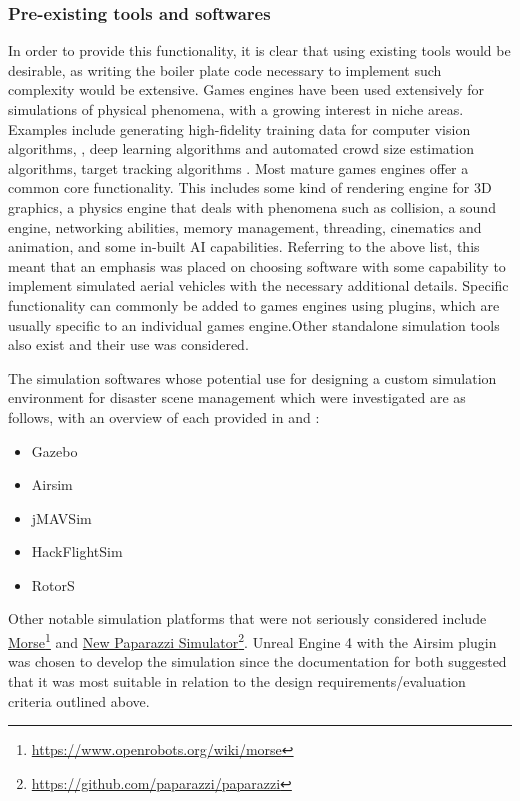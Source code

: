 \subsubsection{Pre-existing tools and softwares}
In order to provide this functionality, it is clear that using existing tools would be desirable, as writing the boiler plate code necessary to implement such complexity would be extensive. Games engines have been used extensively for simulations of physical phenomena, with a growing interest in niche areas. Examples include generating high-fidelity training data for computer vision algorithms, \cite{QiuUnrealCV:Engine}, deep learning algorithms\cite{GaidonVirtualAnalysis} and automated crowd size estimation algorithms\cite{Lee2018DigitalCrowds}, target tracking algorithms \cite{Mueller2016ATracking}. Most mature games engines offer a common core functionality. This includes some kind of rendering engine for 3D graphics, a physics engine that deals with phenomena such as collision, a sound engine, networking abilities, memory management, threading, cinematics and animation, and some in-built AI capabilities. Referring to the above list, this meant that an emphasis was placed on choosing software with some capability to implement simulated aerial vehicles with the necessary additional details. Specific functionality can commonly be added to games engines using plugins, which are usually specific to an individual games engine.Other standalone simulation tools also exist and their use was considered.\par

The simulation softwares whose potential use for designing a custom simulation environment for disaster scene management which were investigated are as follows, with an overview of each provided in \cite{Ebeid2018ASimulators} and \cite{ShahAirSim:Vehicles}: 
\begin{itemize}
    \item Gazebo
    \item Airsim
    \item jMAVSim
    \item HackFlightSim
    \item RotorS
\end{itemize}
Other notable simulation platforms that were not seriously considered include \href{https://www.openrobots.org/wiki/morse}{Morse}\footnote{\href {https://www.openrobots.org/wiki/morse}{https://www.openrobots.org/wiki/morse}} and \href{https://github.com/paparazzi/paparazzi}{New Paparazzi Simulator}\footnote{\href {https://github.com/paparazzi/paparazzi}{https://github.com/paparazzi/paparazzi}}. Unreal Engine 4 with the Airsim plugin was chosen to develop the simulation since the documentation for both suggested that it was most suitable in relation to the design requirements/evaluation criteria outlined above.\par

